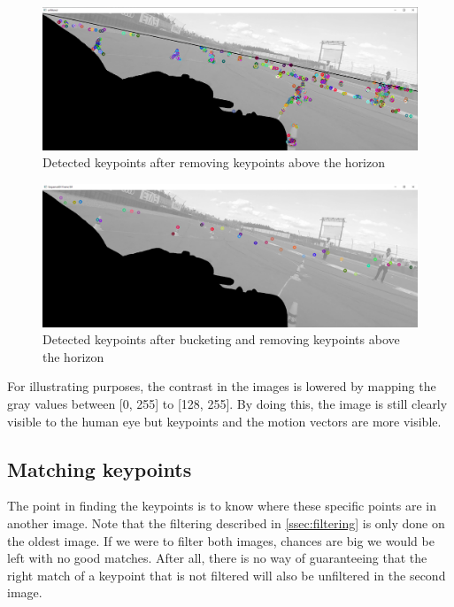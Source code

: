 \begin{figure}
    \centering
    \includegraphics[width=1\textwidth]{figures/Horizon_filtered.png}
    \caption{Detected keypoints after removing keypoints above the horizon}
    \label{fig:horizon}
\end{figure}
\begin{figure}
    \centering
    \includegraphics[width=1\textwidth]{figures/Filtered_keypoints.png}
    \caption{Detected keypoints after bucketing and removing keypoints above the horizon}
    \label{fig:filtered}
\end{figure}

For illustrating purposes, the contrast in the images is lowered by mapping the gray values between [0, 255] to [128, 255]. By doing this, the image is still clearly visible to the human eye but keypoints and the motion vectors are more visible.

\subsection{Matching keypoints}
The point in finding the keypoints is to know where these specific points are in another image. Note that the filtering described in \autoref{ssec:filtering} is only done on the oldest image. If we were to filter both images, chances are big we would be left with no good matches. After all, there is no way of guaranteeing that the right match of a keypoint that is not filtered will also be unfiltered in the second image.\bigskip

